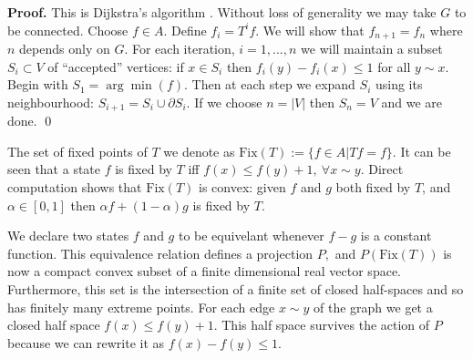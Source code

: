 \documentclass[11pt]{article}
\begin{document}
{\bf Proof.}
This is Dijkstra's algorithm \cite{Dijkstra1959}.
Without loss of generality we may take
$G$ to be connected.
Choose $f\in A.$
Define $f_i = T^i f.$
We will show that $f_{n+1} = f_n$
where $n$ depends only on $G.$
For each iteration, $i=1,...,n$
we will maintain a subset $S_i\subset V$
of ``accepted'' vertices:
if $x\in S_i$ then $f_i(y)-f_i(x)\le 1$ for all $y\sim x.$
Begin with $S_1=\arg\min(f).$
Then at each step we expand $S_i$ using its
neighbourhood: $S_{i+1}=S_i\cup \partial S_i.$
If we choose $n=|V|$ then $S_n=V$ and we are done.
\qed


\def\Fix{\mathrm{Fix}}

The set of fixed points of $T$ we denote as
$\Fix(T):=\{f\in A|Tf=f\}.$
It can be seen that
a state $f$ is fixed by $T$ iff
$f(x)\le f(y)+1,\ \forall x\sim y.$
Direct computation shows that
$\Fix(T)$ is convex:
given $f$ and $g$ both fixed by $T$,
and $\alpha\in[0, 1]$ then $\alpha f + (1-\alpha) g$
is fixed by $T$.

We declare two states $f$ and $g$
to be equivelant whenever $f-g$ is a constant function.
This equivalence relation defines a projection $P,$
and $P(\Fix(T))$ is now a compact convex subset of
a finite dimensional real vector space.
Furthermore, this set is the intersection
of a finite set of closed half-spaces and
so has finitely many extreme points.
For each edge $x\sim y$ of the graph
we get a closed half space
$f(x)\le f(y)+1.$
This half space survives the action of $P$
because we can rewrite it as $f(x)-f(y)\le 1.$
\end{document}
